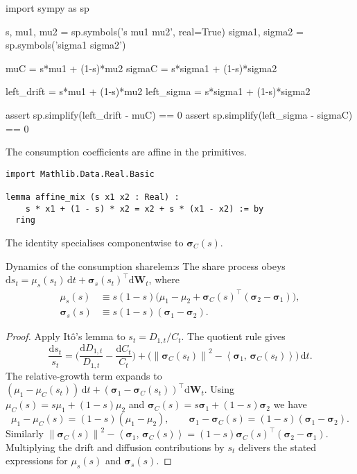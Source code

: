 ﻿\documentclass[11pt,letterpaper,oneside]{article}
\numberwithin{equation}{section}
\newcommand{\1}{\mathbf{1}}
\newcommand{\diff}{\mathrm{d}}
\newcommand{\norm}[1]{\left\lVert #1\right\rVert}
\newcommand{\ip}[2]{\left\langle #1,\,#2\right\rangle}
\begin{document}
\begin{sympycheck}[title={Verification: Consumption dynamics (Lemma~\ref{lem:C})}]
\begin{pyconsole}
import sympy as sp

s, mu1, mu2 = sp.symbols('s mu1 mu2', real=True)
sigma1, sigma2 = sp.symbols('sigma1 sigma2')

muC = s*mu1 + (1-s)*mu2
sigmaC = s*sigma1 + (1-s)*sigma2

left_drift = s*mu1 + (1-s)*mu2
left_sigma = s*sigma1 + (1-s)*sigma2

assert sp.simplify(left_drift - muC) == 0
assert sp.simplify(left_sigma - sigmaC) == 0
\end{pyconsole}
\end{sympycheck}

\begin{leanproof}[title={Affine structure of $\mu_C$ and $\bm{\sigma}_C$}]
The consumption coefficients are affine in the primitives.
\begin{lstlisting}[basicstyle=\ttfamily\small]
import Mathlib.Data.Real.Basic

lemma affine_mix (s x1 x2 : Real) :
    s * x1 + (1 - s) * x2 = x2 + s * (x1 - x2) := by
  ring
\end{lstlisting}
The identity specialises componentwise to $\bm{\sigma}_C(s)$.
\end{leanproof}

\begin{lemma}{Dynamics of the consumption share}{lem:s}
The share process obeys $\diff s_t = \mu_s(s_t)\,\diff t + \bm{\sigma}_s(s_t)^{\top}\diff\bm{W}_t$, where
\begin{align}
  \mu_s(s) &\equiv s(1-s)\Big(\mu_1-\mu_2+\bm{\sigma}_C(s)^{\top}(\bm{\sigma}_2-\bm{\sigma}_1)\Big), \\
  \bm{\sigma}_s(s) &\equiv s(1-s)(\bm{\sigma}_1-\bm{\sigma}_2).
  \label{eq:s_drift}
\end{align}
\end{lemma}
\begin{proof}
Apply It\^o's lemma to $s_t = D_{1,t}/C_t$. The quotient rule gives
\[
  \frac{\diff s_t}{s_t} = \Big(\frac{\diff D_{1,t}}{D_{1,t}}-\frac{\diff C_t}{C_t}\Big) + \Big(\norm{\bm{\sigma}_C(s_t)}^2 - \ip{\bm{\sigma}_1}{\bm{\sigma}_C(s_t)}\Big)\,\diff t.
\]
The relative-growth term expands to $(\mu_1-\mu_C(s_t))\,\diff t + (\bm{\sigma}_1-\bm{\sigma}_C(s_t))^{\top}\diff\bm{W}_t$. Using $\mu_C(s) = s\mu_1 + (1-s)\mu_2$ and $\bm{\sigma}_C(s) = s\bm{\sigma}_1 + (1-s)\bm{\sigma}_2$ we have
\[
  \mu_1-\mu_C(s) = (1-s)(\mu_1-\mu_2),
  \qquad
  \bm{\sigma}_1-\bm{\sigma}_C(s) = (1-s)(\bm{\sigma}_1-\bm{\sigma}_2).
\]
Similarly $\norm{\bm{\sigma}_C(s)}^2 - \ip{\bm{\sigma}_1}{\bm{\sigma}_C(s)} = (1-s)\bm{\sigma}_C(s)^{\top}(\bm{\sigma}_2-\bm{\sigma}_1)$. Multiplying the drift and diffusion contributions by $s_t$ delivers the stated expressions for $\mu_s(s)$ and $\bm{\sigma}_s(s)$.
\end{proof}
\end{document}
